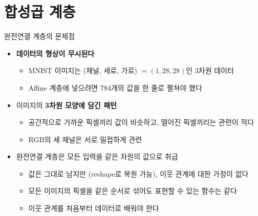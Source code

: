 \documentclass[aspectratio=169,11pt]{beamer}
\begin{document}
\section{합성곱 계층}

\begin{frame}{완전연결 계층의 문제점}
\begin{itemize}
\item \textbf{데이터의 형상이 무시된다}
  \begin{itemize}
  \item MNIST 이미지는 (채널, 세로, 가로) $=(1,28,28)$인 3차원 데이터
  \item Affine 계층에 넣으려면 $784$개의 값을 한 줄로 펼쳐야 했다
  \end{itemize}
\item 이미지의 \textbf{3차원 모양에 담긴 패턴}
  \begin{itemize}
  \item 공간적으로 가까운 픽셀끼리 값이 비슷하고, 떨어진 픽셀끼리는 관련이 적다
  \item RGB의 세 채널은 서로 밀접하게 관련
  \end{itemize}
\item 완전연결 계층은 모든 입력을 같은 차원의 값으로 취급
  \begin{itemize}
  \item 값은 그대로 남지만 (reshape로 복원 가능), 이웃 관계에 대한 가정이 없다
  \item 모든 이미지의 픽셀을 같은 순서로 섞어도 표현할 수 있는 함수는 같다
  \item 이웃 관계를 처음부터 데이터로 배워야 한다
  \end{itemize}
\end{itemize}
\end{frame}
\end{document}

